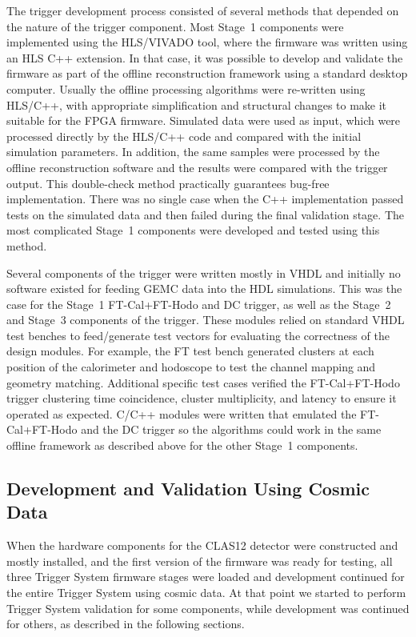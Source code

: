 The trigger development process consisted of several methods that depended on the nature of the trigger
component. Most Stage~1 components were implemented using the HLS/VIVADO tool, where the firmware was
written using an HLS C++ extension. In that case, it was possible to develop and validate the firmware as part
of the offline reconstruction framework using a standard desktop computer. Usually the offline processing
algorithms were re-written using HLS/C++, with appropriate simplification and structural changes to make it
suitable for the FPGA firmware. Simulated data were used as input, which were processed directly by the
HLS/C++ code and compared with the initial simulation parameters. In addition, the same samples were processed
by the offline reconstruction software and the results were compared with the trigger output. This double-check
method practically guarantees bug-free implementation. There was no single case when the C++ implementation
passed tests on the simulated data and then failed during the final validation stage. The most complicated
Stage~1 components were developed and tested using this method.

Several components of the trigger were written mostly in VHDL and initially no software existed for feeding
GEMC data into the HDL simulations. This was the case for the Stage~1 FT-Cal+FT-Hodo and DC trigger, as well
as the Stage~2 and Stage~3 components of the trigger. These modules relied on standard VHDL test benches
to feed/generate test vectors for evaluating the correctness of the design modules. For example, the FT test
bench generated clusters at each position of the calorimeter and hodoscope to test the channel mapping and
geometry matching. Additional specific test cases verified the FT-Cal+FT-Hodo trigger clustering time
coincidence, cluster multiplicity, and latency to ensure it operated as expected. C/C++ modules were written
that emulated the FT-Cal+FT-Hodo and the DC trigger so the algorithms could work in the same offline
framework as described above for the other Stage~1 components.

\subsection{Development and Validation Using Cosmic Data}

When the hardware components for the CLAS12 detector were constructed and mostly installed, and the first
version of the firmware was ready for testing, all three Trigger System firmware stages were loaded and
development continued for the entire Trigger System using cosmic data. At that point we started to perform
Trigger System validation for some components, while development was continued for others, as described in
the following sections.

